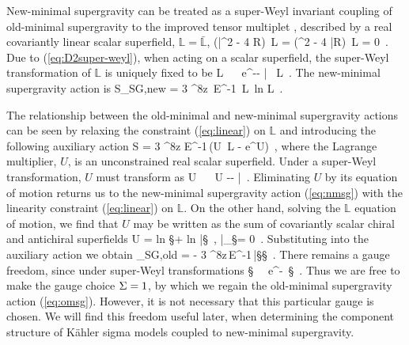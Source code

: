 New-minimal supergravity can be treated as a super-Weyl invariant coupling of old-minimal supergravity to the improved tensor multiplet \cite{deWit:1981fh}, described by a real covariantly linear scalar superfield, ${\mathbb L}={\bar {\mathbb L}}$,
\be
\label{eq:linear}
{({\bar \cD}^2 - 4 R)}\, {\mathbb L} =
(\cD^2 - 4 {\bar R})\, {\mathbb L} = 0~.
\ee
Due to (\ref{eq:D2super-weyl}), when acting on a scalar superfield, the super-Weyl transformation of ${\mathbb L}$ is uniquely fixed to be
\be
\label{eq:LsuperWeyl}
{\mathbb L} ~\to ~ {\rm e}^{-\s - \bar \s} \, {\mathbb L}~.
\ee
The new-minimal supergravity action is \cite{Howe:1981et,Gates:1981tu}
\be
\label{eq:nmsg}
S_{\rm SG,new} = 3 {\int\!^8z}\, E^{-1}\,
{\mathbb L}\, {\rm ln} {\mathbb L}~.
\ee

The relationship between the old-minimal and new-minimal supergravity actions can be seen by relaxing the constraint (\ref{eq:linear}) on ${\mathbb L}$ and introducing the following auxiliary action
\be
\label{eq:aux1}
S = 3 \int\!^8z E^{-1}\,(U\, {\mathbb L}
- {\rm e}^{U})~,
\ee
where the Lagrange multiplier, $U$, is an unconstrained real scalar superfield. Under a super-Weyl transformation, $U$ must transform as
\be
\label{eq:UsuperWeyl}
U ~\to~ U -\s - \bar \s~.
\ee
Eliminating $U$ by its equation of motion returns us to the new-minimal supergravity action (\ref{eq:nmsg}) with the linearity constraint (\ref{eq:linear}) on ${\mathbb L}$. On the other hand, solving the ${\mathbb L}$ equation of motion, we find that $U$ may be written as the sum of covariantly scalar chiral and antichiral superfields 
\be
\label{eq:Usolution}
U = {\rm ln} \S + {\rm ln} {\bar \S}~,\quad\qquad
{\bar \cD}_\ad \S = 0~.
\ee
Substituting into the auxiliary action we obtain
\be
\label{eq:omsg2}
_{\rm SG,old}  
= - 3 {\int\!^8z}\,E^{-1}\,{\bar \S}\S~.
\ee
There remains a gauge freedom, since under super-Weyl transformations
\be
\label{eq:SWeylTransform}
\S ~\to~ {\rm e}^{-\s}\, \S~.
\ee
Thus we are free to make the gauge choice $\S=1$, by which we regain the old-minimal supergravity action (\ref{eq:omsg}). However, it is not necessary that this particular gauge is chosen. We will find this freedom useful later, when determining the component structure of K{\"a}hler sigma models coupled to new-minimal supergravity.


\vskip0.5cm
